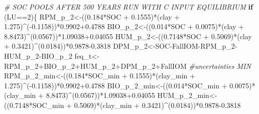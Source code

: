 \documentclass[
  10pt,
  b5paper,
]{book}
\newenvironment{Shaded}{\begin{snugshade}}{\end{snugshade}}
\newcommand{\CommentTok}[1]{\textcolor[rgb]{0.56,0.35,0.01}{\textit{#1}}}
\newcommand{\ControlFlowTok}[1]{\textcolor[rgb]{0.13,0.29,0.53}{\textbf{#1}}}
\newcommand{\DecValTok}[1]{\textcolor[rgb]{0.00,0.00,0.81}{#1}}
\newcommand{\FloatTok}[1]{\textcolor[rgb]{0.00,0.00,0.81}{#1}}
\newcommand{\NormalTok}[1]{#1}
\newcommand{\OtherTok}[1]{\textcolor[rgb]{0.56,0.35,0.01}{#1}}
\newcommand{\SpecialCharTok}[1]{\textcolor[rgb]{0.00,0.00,0.00}{#1}}
\begin{document}
\begin{Shaded}
\begin{Highlighting}[]
\CommentTok{\# SOC POOLS AFTER 500 YEARS RUN WITH C INPUT EQUILIBRIUM}
\ControlFlowTok{if}\NormalTok{ (LU}\SpecialCharTok{==}\DecValTok{2}\NormalTok{)\{}
\NormalTok{RPM\_p\_2}\OtherTok{\textless{}{-}}\NormalTok{((}\FloatTok{0.184}\SpecialCharTok{*}\NormalTok{SOC }\SpecialCharTok{+} \FloatTok{0.1555}\NormalTok{)}\SpecialCharTok{*}\NormalTok{(clay }\SpecialCharTok{+} \FloatTok{1.275}\NormalTok{)}\SpecialCharTok{\^{}}\NormalTok{(}\SpecialCharTok{{-}}\FloatTok{0.1158}\NormalTok{))}\SpecialCharTok{*}\FloatTok{0.9902+0.4788}
\NormalTok{BIO\_p\_2}\OtherTok{\textless{}{-}}\NormalTok{((}\FloatTok{0.014}\SpecialCharTok{*}\NormalTok{SOC }\SpecialCharTok{+} \FloatTok{0.0075}\NormalTok{)}\SpecialCharTok{*}\NormalTok{(clay }\SpecialCharTok{+} \FloatTok{8.8473}\NormalTok{)}\SpecialCharTok{\^{}}\NormalTok{(}\FloatTok{0.0567}\NormalTok{))}\SpecialCharTok{*}\FloatTok{1.09038+0.04055}
\NormalTok{HUM\_p\_2}\OtherTok{\textless{}{-}}\NormalTok{((}\FloatTok{0.7148}\SpecialCharTok{*}\NormalTok{SOC }\SpecialCharTok{+} \FloatTok{0.5069}\NormalTok{)}\SpecialCharTok{*}\NormalTok{(clay }\SpecialCharTok{+} \FloatTok{0.3421}\NormalTok{)}\SpecialCharTok{\^{}}\NormalTok{(}\FloatTok{0.0184}\NormalTok{))}\SpecialCharTok{*}\FloatTok{0.9878{-}0.3818}
\NormalTok{DPM\_p\_2}\OtherTok{\textless{}{-}}\NormalTok{SOC}\SpecialCharTok{{-}}\NormalTok{FallIOM}\SpecialCharTok{{-}}\NormalTok{RPM\_p\_2}\SpecialCharTok{{-}}\NormalTok{HUM\_p\_2}\SpecialCharTok{{-}}\NormalTok{BIO\_p\_2}
\NormalTok{feq\_t}\OtherTok{\textless{}{-}}\NormalTok{RPM\_p\_2}\SpecialCharTok{+}\NormalTok{BIO\_p\_2}\SpecialCharTok{+}\NormalTok{HUM\_p\_2}\SpecialCharTok{+}\NormalTok{DPM\_p\_2}\SpecialCharTok{+}\NormalTok{FallIOM}
\CommentTok{\#uncertainties  MIN}
\NormalTok{RPM\_p\_2\_min}\OtherTok{\textless{}{-}}\NormalTok{((}\FloatTok{0.184}\SpecialCharTok{*}\NormalTok{SOC\_min }\SpecialCharTok{+} \FloatTok{0.1555}\NormalTok{)}\SpecialCharTok{*}\NormalTok{(clay\_min }\SpecialCharTok{+} \FloatTok{1.275}\NormalTok{)}\SpecialCharTok{\^{}}\NormalTok{(}\SpecialCharTok{{-}}\FloatTok{0.1158}\NormalTok{))}\SpecialCharTok{*}\FloatTok{0.9902+0.4788}
\NormalTok{BIO\_p\_2\_min}\OtherTok{\textless{}{-}}\NormalTok{((}\FloatTok{0.014}\SpecialCharTok{*}\NormalTok{SOC\_min }\SpecialCharTok{+} \FloatTok{0.0075}\NormalTok{)}\SpecialCharTok{*}\NormalTok{(clay\_min }\SpecialCharTok{+} \FloatTok{8.8473}\NormalTok{)}\SpecialCharTok{\^{}}\NormalTok{(}\FloatTok{0.0567}\NormalTok{))}\SpecialCharTok{*}\FloatTok{1.09038+0.04055}
\NormalTok{HUM\_p\_2\_min}\OtherTok{\textless{}{-}}\NormalTok{((}\FloatTok{0.7148}\SpecialCharTok{*}\NormalTok{SOC\_min }\SpecialCharTok{+} \FloatTok{0.5069}\NormalTok{)}\SpecialCharTok{*}\NormalTok{(clay\_min }\SpecialCharTok{+} \FloatTok{0.3421}\NormalTok{)}\SpecialCharTok{\^{}}\NormalTok{(}\FloatTok{0.0184}\NormalTok{))}\SpecialCharTok{*}\FloatTok{0.9878{-}0.3818}

\end{Highlighting}
\end{Shaded}
\end{document}
